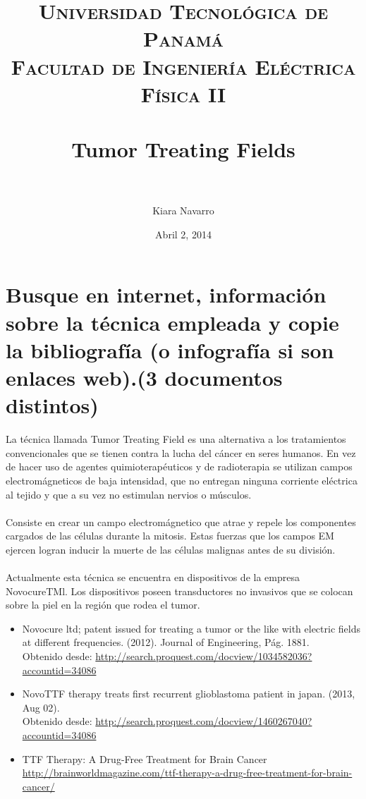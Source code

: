 \documentclass[paper=a4, fontsize=11pt]{scrartcl} %
\title{	
\normalfont \normalsize 
\textsc{Universidad Tecnol\'ogica de Panam\'a \\
		Facultad de Ingenier\'ia El\'ectrica\\
		F\'isica II} \\ [25pt] %
\horrule{0.5pt} \\[0.4cm] %
\huge Tumor Treating Fields\\ %
\horrule{2pt} \\[0.5cm] %
}
\author{Kiara Navarro} %
\date{\normalsize Abril 2, 2014} %
\begin{document}
\maketitle %

\section{Busque en internet, informaci\'on sobre la t\'ecnica empleada y copie la bibliograf\'ia (o infograf\'ia si son enlaces web).(3 documentos distintos)}

La t\'ecnica llamada Tumor Treating Field es una alternativa a los tratamientos convencionales que se tienen contra la lucha del c\'ancer en seres humanos. En vez de hacer uso de agentes quimioterap\'euticos y de radioterapia se utilizan campos electrom\'agneticos de baja intensidad, que no entregan ninguna corriente el\'ectrica al tejido y que a su vez no estimulan nervios o m\'usculos.\\
\\
Consiste en crear un campo electrom\'agnetico que atrae y repele los componentes cargados de las c\'elulas durante la mitosis. Estas fuerzas que los campos EM ejercen logran inducir la muerte de las c\'elulas malignas antes de su divisi\'on.\\
\\
Actualmente esta t\'ecnica se encuentra en dispositivos de la empresa NovocureTMl. Los dispositivos poseen transductores no invasivos que se colocan sobre la piel en la regi\'on que rodea el tumor.  

	\begin{itemize}

		\item Novocure ltd; patent issued for treating a tumor or the like with electric fields at different frequencies. (2012). Journal of Engineering, P\'ag. 1881. \\ 
		Obtenido desde: \url{http://search.proquest.com/docview/1034582036?accountid=34086}
		
		\item NovoTTF therapy treats first recurrent glioblastoma patient in japan. (2013, Aug 02). \\ 
		Obtenido desde: \url{http://search.proquest.com/docview/1460267040?accountid=34086}
		
		\item TTF Therapy: A Drug-Free Treatment for Brain Cancer \\
		\sloppy \url{http://brainworldmagazine.com/ttf-therapy-a-drug-free-treatment-for-brain-cancer/}
		
	\end{itemize}
\end{document}
